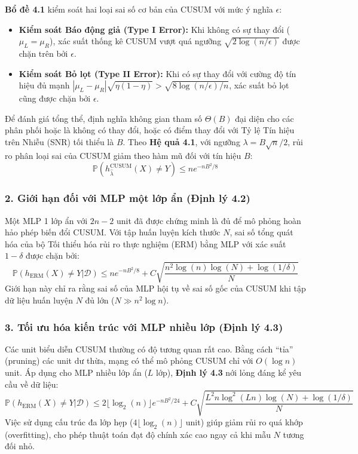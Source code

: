 \textbf{Bổ đề 4.1} kiểm soát hai loại sai số cơ bản của CUSUM với mức ý nghĩa $\epsilon$:
\begin{itemize}
    \item \textbf{Kiểm soát Báo động giả (Type I Error):} Khi không có sự thay đổi ($\mu_L = \mu_R$), xác suất thống kê CUSUM vượt quá ngưỡng $\sqrt{2 \log(n/\epsilon)}$ được chặn trên bởi $\epsilon$.
    \item \textbf{Kiểm soát Bỏ lọt (Type II Error):} Khi có sự thay đổi với cường độ tín hiệu đủ mạnh $|\mu_L - \mu_R|\sqrt{\eta(1 - \eta)} > \sqrt{8 \log(n/\epsilon)/n}$, xác suất bỏ lọt cũng được chặn bởi $\epsilon$.
\end{itemize}

Để đánh giá tổng thể, định nghĩa không gian tham số $\Theta(B)$ đại diện cho các phân phối hoặc là không có thay đổi, hoặc có điểm thay đổi với Tỷ lệ Tín hiệu trên Nhiễu (SNR) tối thiểu là $B$. Theo \textbf{Hệ quả 4.1}, với ngưỡng $\lambda = B\sqrt{n}/2$, rủi ro phân loại sai của CUSUM giảm theo hàm mũ đối với tín hiệu $B$:
$$ \mathbb{P}(h_{\hat{\lambda}}^{\text{CUSUM}}(X) \neq Y) \leq ne^{-nB^2/8} $$

\subsubsection*{2. Giới hạn đối với MLP một lớp ẩn (Định lý 4.2)}
Một MLP 1 lớp ẩn với $2n-2$ unit đã được chứng minh là đủ để mô phỏng hoàn hảo phép biến đổi CUSUM. Với tập huấn luyện kích thước $N$, sai số tổng quát hóa của bộ Tối thiểu hóa rủi ro thực nghiệm (ERM) bằng MLP với xác suất $1 - \delta$ được chặn bởi:
$$ \mathbb{P}(h_{\text{ERM}}(X) \neq Y | \mathcal{D}) \leq ne^{-nB^2/8} + C\sqrt{\frac{n^2\log(n)\log(N) + \log(1/\delta)}{N}} $$
Giới hạn này chỉ ra rằng sai số của MLP hội tụ về sai số gốc của CUSUM khi tập dữ liệu huấn luyện $N$ đủ lớn ($N \gg n^2 \log n$).

\subsubsection*{3. Tối ưu hóa kiến trúc với MLP nhiều lớp (Định lý 4.3)}
Các unit biểu diễn CUSUM thường có độ tương quan rất cao. Bằng cách ``tỉa'' (pruning) các unit dư thừa, mạng có thể mô phỏng CUSUM chỉ với $O(\log n)$ unit. Áp dụng cho MLP nhiều lớp ẩn ($L$ lớp), \textbf{Định lý 4.3} nới lỏng đáng kể yêu cầu về dữ liệu:
$$ \mathbb{P}(h_{\text{ERM}}(X) \neq Y | \mathcal{D}) \leq 2\lfloor \log_2(n) \rfloor e^{-nB^2/24} + C\sqrt{\frac{L^2 n \log^2(Ln)\log(N) + \log(1/\delta)}{N}} $$
Việc sử dụng cấu trúc đa lớp hẹp ($4\lfloor \log_2(n) \rfloor$ unit) giúp giảm rủi ro quá khớp (overfitting), cho phép thuật toán đạt độ chính xác cao ngay cả khi mẫu $N$ tương đối nhỏ.
